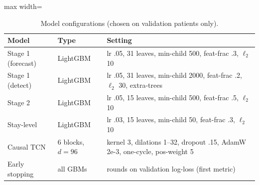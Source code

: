 \begin{table}[!t]
\centering\scriptsize
\caption{Model configurations (chosen on validation patients only).}
\label{tab:hyper}
\begin{adjustbox}{max width=\linewidth}
\begin{tabular}{p{1.8cm}p{1.5cm}>{\raggedright\arraybackslash}p{4.3cm}}
\toprule
Model & Type & Setting \\
\midrule
Stage 1 (forecast) & LightGBM & lr .05, 31 leaves, min-child 500, feat-frac .3, $\ell_2$ 10 \\
Stage 1 (detect) & LightGBM & lr .05, 31 leaves, min-child 2000, feat-frac .2, $\ell_2$ 30, extra-trees \\
Stage 2 & LightGBM & lr .05, 15 leaves, min-child 500, feat-frac .5, $\ell_2$ 10 \\
Stay-level & LightGBM & lr .03, 15 leaves, min-child 50, feat-frac .3, $\ell_2$ 10 \\
Causal TCN & 6 blocks, $d{=}96$ & kernel 3, dilations 1--32, dropout .15, AdamW 2e-3, one-cycle, pos-weight 5 \\
Early stopping & all GBMs & 100 rounds on validation log-loss (first metric) \\
\bottomrule
\end{tabular}
\end{adjustbox}
\end{table}
